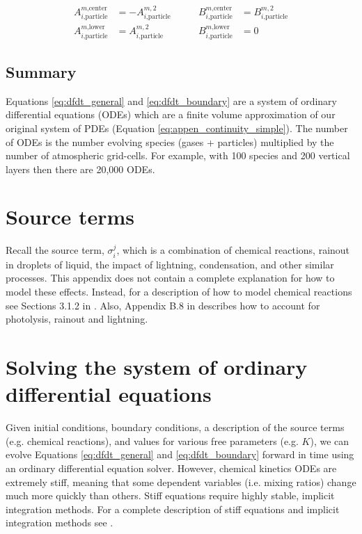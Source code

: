 \begin{equation*}
  \begin{aligned}
  A_{i\text{,particle}}^{m\text{,center}} &= - A_{i\text{,particle}}^{m,2} \\
  A_{i\text{,particle}}^{m\text{,lower}} &= A_{i\text{,particle}}^{m,2}
  \end{aligned}
  \quad\quad
  \begin{aligned}
  B_{i\text{,particle}}^{m\text{,center}} &= B_{i\text{,particle}}^{m,2} \\
  B_{i\text{,particle}}^{m\text{,lower}} &= 0
  \end{aligned}
\end{equation*}

\subsection{Summary}

Equations \eqref{eq:dfdt_general} and \eqref{eq:dfdt_boundary} are a system of ordinary differential equations (ODEs) which are a finite volume approximation of our original system of PDEs (Equation \eqref{eq:appen_continuity_simple}). The number of ODEs is the number evolving species (gases + particles) multiplied by the number of atmospheric grid-cells. For example, with 100 species and 200 vertical layers then there are 20,000 ODEs. 

\section{Source terms}

Recall the source term, $\sigma_i^j$, which is a combination of chemical reactions, rainout in droplets of liquid, the impact of lightning, condensation, and other similar processes. This appendix does not contain a complete explanation for how to model these effects. Instead, for a description of how to model chemical reactions see Sections 3.1.2 in \citet{Catling_2017}. Also, Appendix B.8 in \citet{Catling_2017} describes how to account for photolysis, rainout and lightning.

\section{Solving the system of ordinary differential equations}

Given initial conditions, boundary conditions, a description of the source terms (e.g. chemical reactions), and values for various free parameters (e.g. $K$), we can evolve Equations \eqref{eq:dfdt_general} and \eqref{eq:dfdt_boundary} forward in time using an ordinary differential equation solver. However, chemical kinetics ODEs are extremely stiff, meaning that some dependent variables (i.e. mixing ratios) change much more quickly than others. Stiff equations require highly stable, implicit integration methods. For a complete description of stiff equations and implicit integration methods see \citet{Hairer_1996}. 

